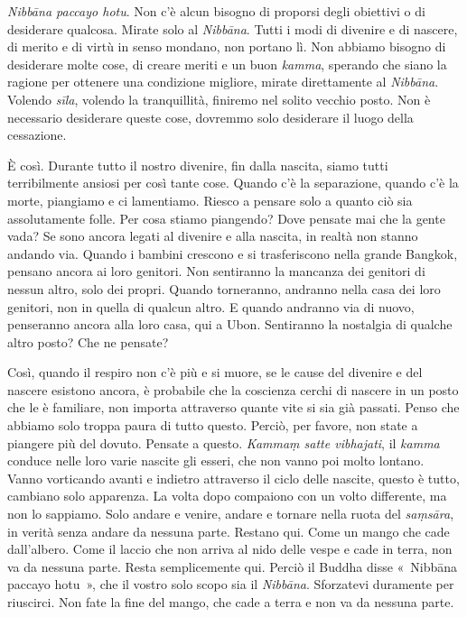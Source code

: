 \emph{Nibbāna paccayo hotu}. Non c'è alcun bisogno di proporsi degli
obiettivi o di desiderare qualcosa. Mirate solo al \emph{Nibbāna}. Tutti
i modi di divenire e di nascere, di merito e di virtù in senso mondano,
non portano lì. Non abbiamo bisogno di desiderare molte cose, di creare
meriti e un buon \emph{kamma}, sperando che siano la ragione per
ottenere una condizione migliore, mirate direttamente al \emph{Nibbāna}.
Volendo \emph{sīla}, volendo la tranquillità, finiremo nel solito
vecchio posto. Non è necessario desiderare queste cose, dovremmo solo
desiderare il luogo della cessazione.

È così. Durante tutto il nostro divenire, fin dalla nascita, siamo tutti
terribilmente ansiosi per così tante cose. Quando c'è la separazione,
quando c'è la morte, piangiamo e ci lamentiamo. Riesco a pensare solo a
quanto ciò sia assolutamente folle. Per cosa stiamo piangendo? Dove
pensate mai che la gente vada? Se sono ancora legati al divenire e alla
nascita, in realtà non stanno andando via. Quando i bambini crescono e
si trasferiscono nella grande Bangkok, pensano ancora ai loro genitori.
Non sentiranno la mancanza dei genitori di nessun altro, solo dei
propri. Quando torneranno, andranno nella casa dei loro genitori, non in
quella di qualcun altro. E quando andranno via di nuovo, penseranno
ancora alla loro casa, qui a Ubon. Sentiranno la nostalgia di qualche
altro posto? Che ne pensate?

Così, quando il respiro non c'è più e si muore, se le cause del divenire
e del nascere esistono ancora, è probabile che la coscienza cerchi di
nascere in un posto che le è familiare, non importa attraverso quante
vite si sia già passati. Penso che abbiamo solo troppa paura di tutto
questo. Perciò, per favore, non state a piangere più del dovuto. Pensate
a questo. \emph{Kammaṃ satte vibhajati}, il \emph{kamma} conduce nelle
loro varie nascite gli esseri, che non vanno poi molto lontano. Vanno
vorticando avanti e indietro attraverso il ciclo delle nascite, questo è
tutto, cambiano solo apparenza. La volta dopo compaiono con un volto
differente, ma non lo sappiamo. Solo andare e venire, andare e tornare
nella ruota del \emph{saṃsāra}, in verità senza andare da nessuna parte.
Restano qui. Come un mango che cade dall'albero. Come il laccio che non
arriva al nido delle vespe e cade in terra, non va da nessuna parte.
Resta semplicemente qui. Perciò il Buddha disse «~Nibbāna paccayo
hotu~», che il vostro solo scopo sia il \emph{Nibbāna}. Sforzatevi
duramente per riuscirci. Non fate la fine del mango, che cade a terra e
non va da nessuna parte.

